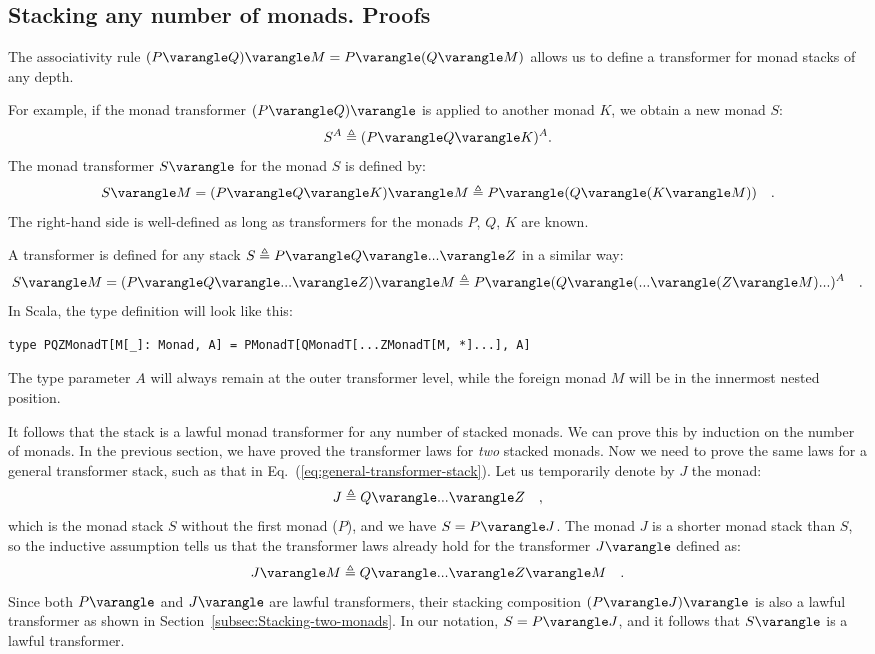 \subsection{Stacking any number of monads. Proofs\label{subsec:Stacking-any-number-of-monads}}

The associativity rule $(P\varangle Q)\varangle M=P\varangle(Q\varangle M)$
allows us to define a transformer for monad stacks of any depth.

For example, if the monad transformer $(P\varangle Q)\varangle$ is
applied to another monad $K$, we obtain a new monad $S$:
\[
S^{A}\triangleq(P\varangle Q\varangle K)^{A}.
\]
The monad transformer $S\varangle$ for the monad $S$ is defined
by:
\[
S\varangle M=(P\varangle Q\varangle K)\varangle M\triangleq P\varangle(Q\varangle(K\varangle M))\quad.
\]
The right-hand side is well-defined as long as transformers for the
monads $P$, $Q$, $K$ are known.

A transformer is defined for any stack $S\triangleq P\varangle Q\varangle...\varangle Z$
in a similar way:
\begin{equation}
S\varangle M=(P\varangle Q\varangle...\varangle Z)\varangle M\triangleq P\varangle(Q\varangle(...\varangle(Z\varangle M)...)^{A}\quad.\label{eq:general-transformer-stack}
\end{equation}
In Scala, the type definition will look like this:
\begin{lstlisting}
type PQZMonadT[M[_]: Monad, A] = PMonadT[QMonadT[...ZMonadT[M, *]...], A]
\end{lstlisting}
The type parameter $A$ will always remain at the outer transformer
level, while the foreign monad $M$ will be in the innermost nested
position.

It follows that the stack is a lawful monad transformer for any number
of stacked monads. We can prove this by induction on the number of
monads. In the previous section, we have proved the transformer laws
for \emph{two} stacked monads. Now we need to prove the same laws
for a general transformer stack, such as that in Eq.~(\ref{eq:general-transformer-stack}).
Let us temporarily denote by $J$ the monad:
\[
J\triangleq Q\varangle...\varangle Z\quad,
\]
which is the monad stack $S$ without the first monad ($P$), and
we have $S=P\varangle J$. The monad $J$ is a shorter monad stack
than $S$, so the inductive assumption tells us that the transformer
laws already hold for the transformer $J\varangle$ defined as:
\[
J\varangle M\triangleq Q\varangle...\varangle Z\varangle M\quad.
\]
Since both $P\varangle$ and $J\varangle$ are lawful transformers,
their stacking composition $(P\varangle J)\varangle$ is also a lawful
transformer as shown in Section~\ref{subsec:Stacking-two-monads}.
In our notation, $S=P\varangle J$, and it follows that $S\varangle$
is a lawful transformer.

